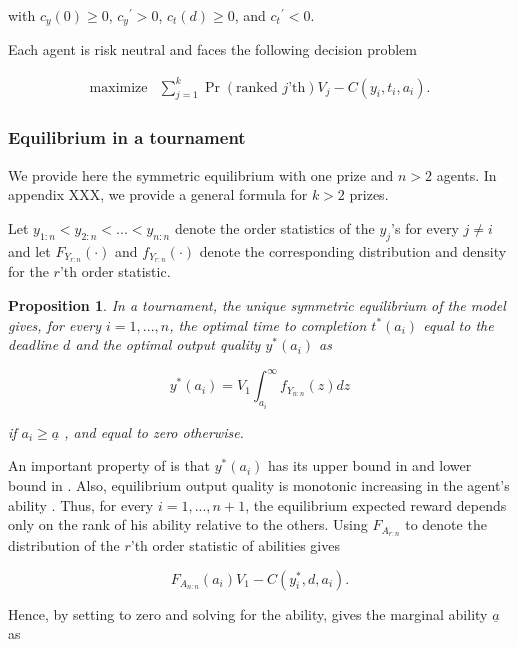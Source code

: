 \documentclass[12pt,]{article}
\newtheorem{proposition}{Proposition}
\begin{document}
with \({c_{y}}(0)\geq 0\), \({c_{y}}^\prime>0\), \({c_{t}}(d)\geq 0\),
and \({c_{t}}^\prime<0\).

Each agent is risk neutral and faces the following decision problem

\[\begin{array}{ll}
    \mbox{maximize} & \sum_{j=1}^k \Pr(\text{ranked $j$'th}) V_j  - C(y_i, t_i, a_i).
  \end{array}\]

\subsubsection{Equilibrium in a
tournament}\label{equilibrium-in-a-tournament}

We provide here the symmetric equilibrium with one prize and \(n>2\)
agents. In appendix XXX, we provide a general formula for \(k>2\)
prizes.

Let \(y_{1:n} < y_{2:n} < ... < y_{n:n}\) denote the order statistics of
the \(y_j\)'s for every \(j\neq i\) and let \({F_{Y_{r:n}}}(\cdot)\) and
\({f_{Y_{r:n}}}(\cdot)\) denote the corresponding distribution and
density for the \(r\)'th order statistic.

\begin{proposition}

In a tournament, the unique symmetric equilibrium of the model gives,
for every \(i=1, ..., n\), the optimal time to completion \(t^*(a_i)\)
equal to the deadline \(d\) and the optimal output quality \(y^*(a_i)\)
as

\[\label{eq: optimal bid tournament}
  y^*(a_i) =  V_1 \int_{a_i}^\infty {f_{Y_{n:n}}} (z) dz\]

if \({a_i}\geq {\underline a}\) \citep[see][]{moldovanu2001optimal}, and
equal to zero otherwise.

\end{proposition}

An important property of is that \(y^*(a_i)\) has its upper bound in and
lower bound in . Also, equilibrium output quality is monotonic
increasing in the agent's ability \citep[see][]{moldovanu2001optimal}.
Thus, for every \(i=1, ..., n+1\), the equilibrium expected reward
depends only on the rank of his ability relative to the others. Using
\({F_{A_{r:n}}}\) to denote the distribution of the \(r\)'th order
statistic of abilities gives

\[\label{eq: expected payoffs tournament}
  {F_{A_{n:n}}}(a_i) V_1  - C(y_i^*, d, a_i).\]

Hence, by setting to zero and solving for the ability, gives the
marginal ability \({\underline a}\) as
\end{document}
